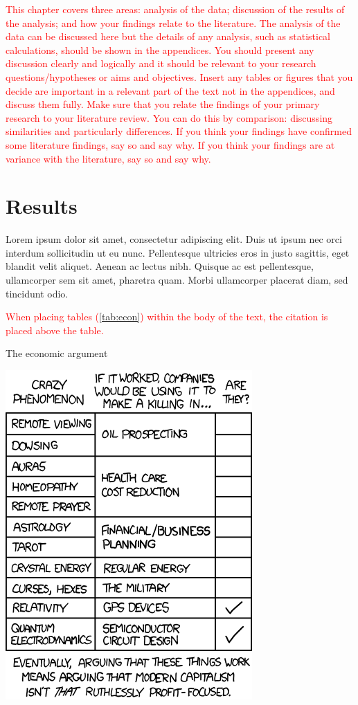 \textcolor{red}{This chapter covers three areas: analysis of the data; discussion of the results of the analysis; and how your findings relate to the literature. The analysis of the data can be discussed here but the details of any analysis, such as statistical calculations, should be shown in the appendices. You should present any discussion clearly and logically and it should be relevant to your research questions/hypotheses or aims and objectives. Insert any tables or figures that you decide are important in a relevant part of the text not in the appendices, and discuss them fully. Make sure that you relate the findings of your primary research to your literature review. You can do this by comparison: discussing similarities and particularly differences. If you think your findings have confirmed some literature findings, say so and say why. If you think your findings are at variance with the literature, say so and say why.}
\section{Results}
Lorem ipsum dolor sit amet, consectetur adipiscing elit. Duis ut ipsum nec orci interdum sollicitudin ut eu nunc. Pellentesque ultricies eros in justo sagittis, eget blandit velit aliquet. Aenean ac lectus nibh. Quisque ac est pellentesque, ullamcorper sem sit amet, pharetra quam. Morbi ullamcorper placerat diam, sed tincidunt odio.

\textcolor{red}{When placing tables (\autoref{tab:econ}) within the body of the text, the citation is placed above the table.} 

\begin{table}[!ht]
  \centering
  {\small {\it \caption{The economic argument \label{tab:econ} }}}
  \includegraphics [scale=0.5]{images/the_economic_argument.png} \\
\end{table}

